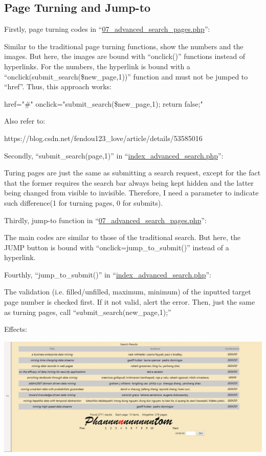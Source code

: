 \documentclass[10pt,twoside,a4paper,titlepage]{article}
\begin{document}
	\subsection{Page Turning and Jump-to}
		Firstly, page turning codes in “\underline{07\_advanced\_search\_pages.php}”:\par
		Similar to the traditional page turning functions, show the numbers and the images. But here, the images are bound with “onclick()” functions instead of hyperlinks. For the numbers, the hyperlink is bound with a “onclick(submit\_search(\$new\_page,1))” function and must not be jumped to “href”. Thus, this approach works:\par
		\indent\indent href="\#" onclick="submit\_search(\$new\_page,1); return false;"\par
		Also refer to:\par
		\indent\indent https://blog.csdn.net/fendou123\_love/article/details/53585016\newline\par
		Secondly, “submit\_search(page,1)” in “\underline{index\_advanced\_search.php}”:\par
		Turing pages are just the same as submitting a search request, except for the fact that the former requires the search bar always being kept hidden and the latter being changed from visible to invisible. Therefore, I need a parameter to indicate such difference(1 for turning pages, 0 for submits).\newline\par
		Thirdly, jump-to function in “\underline{07\_advanced\_search\_pages.php}”:\par
		The main codes are similar to those of the traditional search. But here, the JUMP button is bound with “onclick=jump\_to\_submit()” instead of a hyperlink.\newline\par
		Fourthly, “jump\_to\_submit()” in “\underline{index\_advanced\_search.php}”:\par
		The validation (i.e. filled/unfilled, maximum, minimum) of the inputted target page number is checked first. If it not valid, alert the error. Then, just the same as turning pages, call “submit\_search(new\_page,1);”\newline\par
		Effects:\newline\par
		\includegraphics[width=1\textwidth]{gzl/16.jpg}
\end{document}
